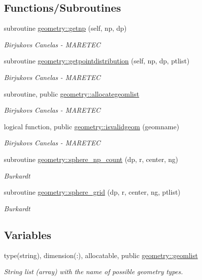 \subsection*{Functions/\+Subroutines}
\begin{DoxyCompactItemize}
\item 
subroutine \mbox{\hyperlink{namespacegeometry_ad14d7800ac13b9a6722ac96b06ce94c9}{geometry\+::getnp}} (self, np, dp)
\begin{DoxyCompactList}\small\item\em Birjukovs Canelas -\/ M\+A\+R\+E\+T\+EC \end{DoxyCompactList}\item 
subroutine \mbox{\hyperlink{namespacegeometry_a726dae6e63f052138bd3346de439fbc4}{geometry\+::getpointdistribution}} (self, np, dp, ptlist)
\begin{DoxyCompactList}\small\item\em Birjukovs Canelas -\/ M\+A\+R\+E\+T\+EC \end{DoxyCompactList}\item 
subroutine, public \mbox{\hyperlink{namespacegeometry_a17652db20fde3f883b4fc778e0e6cdda}{geometry\+::allocategeomlist}}
\begin{DoxyCompactList}\small\item\em Birjukovs Canelas -\/ M\+A\+R\+E\+T\+EC \end{DoxyCompactList}\item 
logical function, public \mbox{\hyperlink{namespacegeometry_a56488a00edf7ba4e670ceffd5c36f13f}{geometry\+::isvalidgeom}} (geomname)
\begin{DoxyCompactList}\small\item\em Birjukovs Canelas -\/ M\+A\+R\+E\+T\+EC \end{DoxyCompactList}\item 
subroutine \mbox{\hyperlink{namespacegeometry_afb10fc3d303c98de110234acf3615274}{geometry\+::sphere\+\_\+np\+\_\+count}} (dp, r, center, ng)
\begin{DoxyCompactList}\small\item\em Burkardt \end{DoxyCompactList}\item 
subroutine \mbox{\hyperlink{namespacegeometry_ae1ab88f5bfa764765180e1ba417e4bdf}{geometry\+::sphere\+\_\+grid}} (dp, r, center, ng, ptlist)
\begin{DoxyCompactList}\small\item\em Burkardt \end{DoxyCompactList}\end{DoxyCompactItemize}
\subsection*{Variables}
\begin{DoxyCompactItemize}
\item 
type(string), dimension(\+:), allocatable, public \mbox{\hyperlink{namespacegeometry_a879bd9ccab6fc42f051bbfc9f0560a62}{geometry\+::geomlist}}
\begin{DoxyCompactList}\small\item\em String list (array) with the name of possible geometry types. \end{DoxyCompactList}\end{DoxyCompactItemize}
